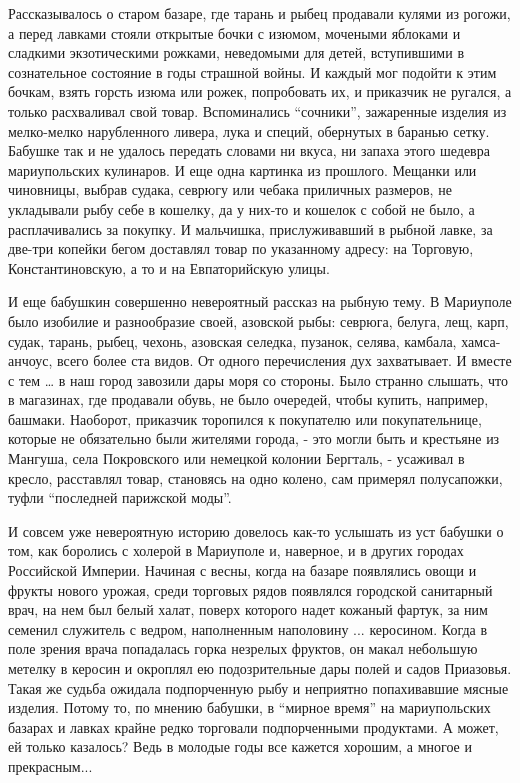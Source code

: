 Рассказывалось о старом базаре, где тарань и рыбец продавали кулями из рогожи,
а перед  лавками стояли открытые бочки с изюмом, мочеными яблоками и сладкими
экзотическими рожками, неведомыми для детей, вступившими в сознательное
состояние в годы страшной войны. И каждый мог подойти к этим бочкам, взять
горсть изюма или рожек, попробовать их, и приказчик не ругался, а только
расхваливал свой товар. Вспоминались \enquote{сочники}, зажаренные изделия из
мелко-мелко нарубленного ливера, лука и специй, обернутых в баранью сетку.
Бабушке так и не удалось передать словами ни вкуса, ни запаха этого шедевра
мариупольских кулинаров. И еще одна картинка из прошлого. Мещанки или
чиновницы, выбрав судака, севрюгу или чебака приличных размеров, не укладывали
рыбу себе в кошелку, да у них-то и кошелок с собой не было, а расплачивались за
покупку. И мальчишка, прислуживавший в рыбной лавке, за две-три копейки бегом
доставлял товар по указанному адресу: на Торговую, Константиновскую, а то и на
Евпаторийскую улицы.

И еще бабушкин совершенно невероятный рассказ на рыбную тему. В Мариуполе было
изобилие и разнообразие  своей, азовской рыбы: севрюга, белуга, лещ, карп,
судак, тарань, рыбец, чехонь, азовская селедка, пузанок, селява, камбала,
хамса-анчоус, всего более ста видов. От одного перечисления  дух захватывает. И
вместе с тем … в наш город завозили  дары моря со стороны. Было странно
слышать, что в магазинах, где продавали обувь, не было очередей, чтобы купить,
например, башмаки. Наоборот, приказчик торопился к покупателю или
покупательнице, которые не обязательно были жителями города, - это могли быть и
крестьяне из Мангуша, села Покровского или немецкой колонии Бергталь, -
усаживал в кресло, расставлял товар, становясь на одно колено, сам примерял
полусапожки, туфли \enquote{последней парижской моды}.

И совсем уже невероятную историю довелось как-то услышать из уст бабушки о том,
как боролись с холерой в Мариуполе и, наверное, и в других городах Российской
Империи. Начиная с весны, когда на базаре появлялись овощи и фрукты нового
урожая, среди торговых рядов появлялся городской санитарный врач, на нем был
белый халат, поверх которого надет кожаный фартук, за ним семенил служитель с
ведром, наполненным наполовину ... керосином. Когда в поле зрения врача
попадалась горка незрелых фруктов, он макал небольшую метелку в керосин и
окроплял ею подозрительные дары полей и садов Приазовья. Такая же судьба
ожидала подпорченную рыбу и неприятно попахивавшие мясные изделия. Потому то,
по мнению бабушки, в \enquote{мирное время} на мариупольских базарах и лавках крайне
редко торговали подпорченными продуктами. А может, ей только казалось? Ведь в
молодые годы все кажется хорошим, а многое и прекрасным...

